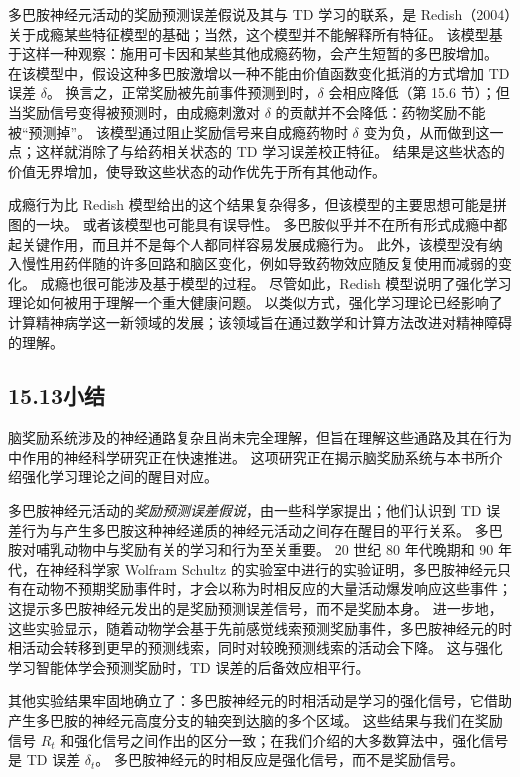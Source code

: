 \documentclass[UTF8, 12pt, fontset=fandol, oneside]{ctexart}
\begin{document}
多巴胺神经元活动的奖励预测误差假说及其与 TD 学习的联系，是 Redish（2004）关于成瘾某些特征模型的基础；当然，这个模型并不能解释所有特征。
该模型基于这样一种观察：施用可卡因和某些其他成瘾药物，会产生短暂的多巴胺增加。
在该模型中，假设这种多巴胺激增以一种不能由价值函数变化抵消的方式增加 TD 误差 $\delta$。
换言之，正常奖励被先前事件预测到时，$\delta$ 会相应降低（第 15.6 节）；但当奖励信号变得被预测时，由成瘾刺激对 $\delta$ 的贡献并不会降低：药物奖励不能被“预测掉”。
该模型通过阻止奖励信号来自成瘾药物时 $\delta$ 变为负，从而做到这一点；这样就消除了与给药相关状态的 TD 学习误差校正特征。
结果是这些状态的价值无界增加，使导致这些状态的动作优先于所有其他动作。

成瘾行为比 Redish 模型给出的这个结果复杂得多，但该模型的主要思想可能是拼图的一块。
或者该模型也可能具有误导性。
多巴胺似乎并不在所有形式成瘾中都起关键作用，而且并不是每个人都同样容易发展成瘾行为。
此外，该模型没有纳入慢性用药伴随的许多回路和脑区变化，例如导致药物效应随反复使用而减弱的变化。
成瘾也很可能涉及基于模型的过程。
尽管如此，Redish 模型说明了强化学习理论如何被用于理解一个重大健康问题。
以类似方式，强化学习理论已经影响了计算精神病学这一新领域的发展；该领域旨在通过数学和计算方法改进对精神障碍的理解。

\subsection*{15.13\quad 小结}

脑奖励系统涉及的神经通路复杂且尚未完全理解，但旨在理解这些通路及其在行为中作用的神经科学研究正在快速推进。
这项研究正在揭示脑奖励系统与本书所介绍强化学习理论之间的醒目对应。

多巴胺神经元活动的\emph{奖励预测误差假说}，由一些科学家提出；他们认识到 TD 误差行为与产生多巴胺这种神经递质的神经元活动之间存在醒目的平行关系。
多巴胺对哺乳动物中与奖励有关的学习和行为至关重要。
20 世纪 80 年代晚期和 90 年代，在神经科学家 Wolfram Schultz 的实验室中进行的实验证明，多巴胺神经元只有在动物不预期奖励事件时，才会以称为时相反应的大量活动爆发响应这些事件；这提示多巴胺神经元发出的是奖励预测误差信号，而不是奖励本身。
进一步地，这些实验显示，随着动物学会基于先前感觉线索预测奖励事件，多巴胺神经元的时相活动会转移到更早的预测线索，同时对较晚预测线索的活动会下降。
这与强化学习智能体学会预测奖励时，TD 误差的后备效应相平行。

其他实验结果牢固地确立了：多巴胺神经元的时相活动是学习的强化信号，它借助产生多巴胺的神经元高度分支的轴突到达脑的多个区域。
这些结果与我们在奖励信号 $R_t$ 和强化信号之间作出的区分一致；在我们介绍的大多数算法中，强化信号是 TD 误差 $\delta_t$。
多巴胺神经元的时相反应是强化信号，而不是奖励信号。
\end{document}
